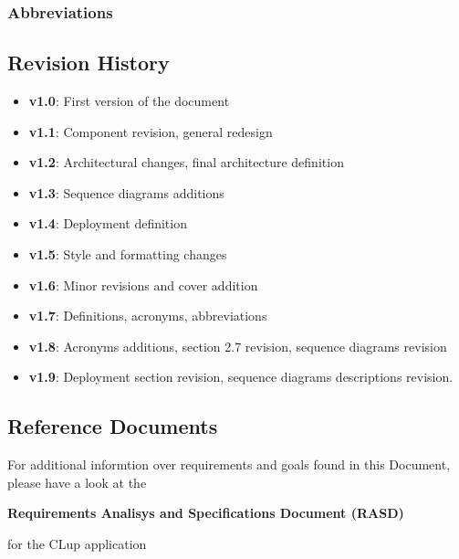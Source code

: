 \subsubsection{Abbreviations}
\subsection{Revision History}
\begin{itemize}
	\item \textbf{v1.0}: First version of the document
	\item \textbf{v1.1}: Component revision, general redesign
	\item \textbf{v1.2}: Architectural changes, final architecture definition
	\item \textbf{v1.3}: Sequence diagrams additions
	\item \textbf{v1.4}: Deployment definition
	\item \textbf{v1.5}: Style and formatting changes
	\item \textbf{v1.6}: Minor revisions and cover addition
	\item \textbf{v1.7}: Definitions, acronyms, abbreviations
	\item \textbf{v1.8}: Acronyms additions, section 2.7 revision, sequence diagrams revision
	\item \textbf{v1.9}: Deployment section revision, sequence diagrams descriptions revision.
	
	
\end{itemize}

\subsection{Reference Documents}
For additional informtion over requirements and goals found in this Document, please have a look at the \begin{large}\textbf{Requirements Analisys and Specifications Document (RASD)}                                                                                                                                                                         \end{large} for the CLup application
